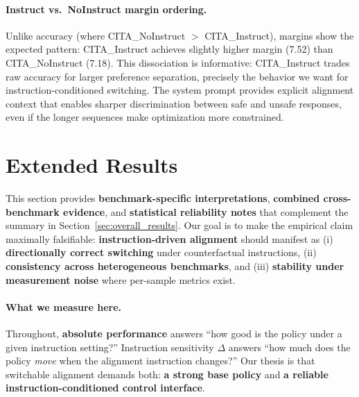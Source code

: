 \paragraph{Instruct vs.\ NoInstruct margin ordering.}
Unlike accuracy (where \textsc{CITA}\_NoInstruct $>$ \textsc{CITA}\_Instruct), margins show the expected pattern: \textsc{CITA}\_Instruct achieves slightly higher margin (7.52) than \textsc{CITA}\_NoInstruct (7.18).
This dissociation is informative: \textsc{CITA}\_Instruct trades raw accuracy for larger preference separation, precisely the behavior we want for instruction-conditioned switching.
The system prompt provides explicit alignment context that enables sharper discrimination between safe and unsafe responses, even if the longer sequences make optimization more constrained.













\clearpage
\newpage


\vspace{-2mm}
\section{Extended Results}
\label{sec:appendix_extended_results}

This section provides \textbf{benchmark-specific interpretations}, \textbf{combined cross-benchmark evidence}, and \textbf{statistical reliability notes} that complement the summary in Section~\ref{sec:overall_results}.
Our goal is to make the empirical claim maximally falsifiable:
\textbf{instruction-driven alignment} should manifest as (i) \textbf{directionally correct switching} under counterfactual instructions, (ii) \textbf{consistency across heterogeneous benchmarks}, and (iii) \textbf{stability under measurement noise} where per-sample metrics exist.

\vspace{-0.3em}
\paragraph{\textbf{What we measure here.}}
Throughout, \textbf{absolute performance} answers ``how good is the policy under a given instruction setting?''
Instruction sensitivity $\Delta$ answers ``how much does the policy \emph{move} when the alignment instruction changes?''
Our thesis is that switchable alignment demands both:
\textbf{a strong base policy} and \textbf{a reliable instruction-conditioned control interface}.

